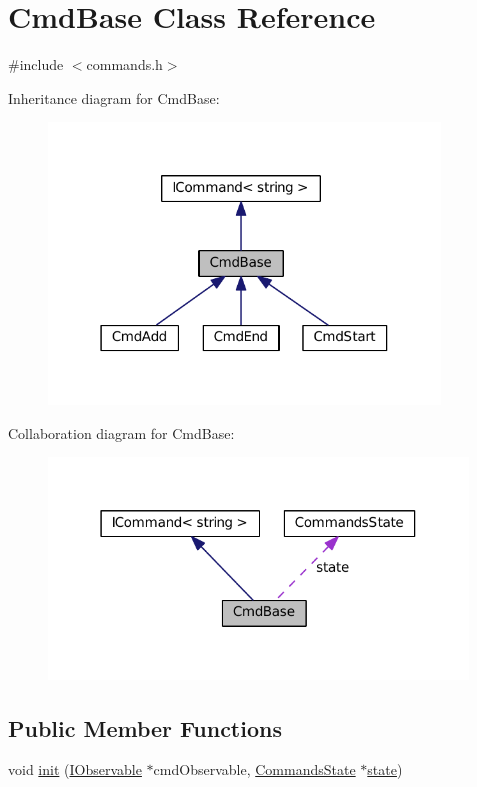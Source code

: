 \hypertarget{class_cmd_base}{}\section{Cmd\+Base Class Reference}
\label{class_cmd_base}


{\ttfamily \#include $<$commands.\+h$>$}



Inheritance diagram for Cmd\+Base\+:
\nopagebreak
\begin{figure}[H]
\begin{center}
\leavevmode
\includegraphics[width=295pt]{class_cmd_base__inherit__graph}
\end{center}
\end{figure}


Collaboration diagram for Cmd\+Base\+:
\nopagebreak
\begin{figure}[H]
\begin{center}
\leavevmode
\includegraphics[width=316pt]{class_cmd_base__coll__graph}
\end{center}
\end{figure}
\subsection*{Public Member Functions}
\begin{DoxyCompactItemize}
\item 
void \hyperlink{class_cmd_base_add2802c0ebd8fb70633b83432db0dec2}{init} (\hyperlink{struct_i_observable}{I\+Observable} $\ast$cmd\+Observable, \hyperlink{class_commands_state}{Commands\+State} $\ast$\hyperlink{class_cmd_base_a8960a4214ffcf20763e55b2eb3520a99}{state})
\end{DoxyCompactItemize}
